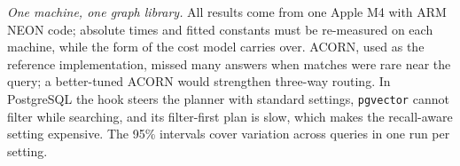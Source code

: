 \emph{One machine, one graph library.} All results come from one Apple M4 with ARM NEON code; absolute times and fitted constants must be re-measured on each machine, while the form of the cost model carries over. ACORN, used as the reference implementation, missed many answers when matches were rare near the query; a better-tuned ACORN would strengthen three-way routing. In PostgreSQL the hook steers the planner with standard settings, \texttt{pgvector} cannot filter while searching, and its filter-first plan is slow, which makes the recall-aware setting expensive. The 95\% intervals cover variation across queries in one run per setting.
